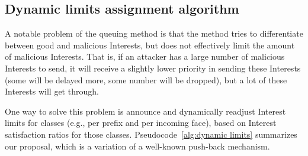
\subsection{Dynamic limits assignment algorithm}
\label{sec:dynamic limits}

A notable problem of the queuing method is that the method tries to differentiate between good and malicious Interests, but does not effectively limit the amount of malicious Interests.
That is, if an attacker has a large number of malicious Interests to send, it will receive a slightly lower priority in sending these Interests (some will be delayed more, some number will be dropped), but a lot of these Interests will get through.

One way to solve this problem is announce and dynamically readjust Interest limits for classes (e.g., per prefix and per incoming face), based on Interest satisfaction ratios for those classes. 
Pseudocode~\ref{alg:dynamic limits} summarizes our proposal, which is a variation of a well-known push-back mechanism.




